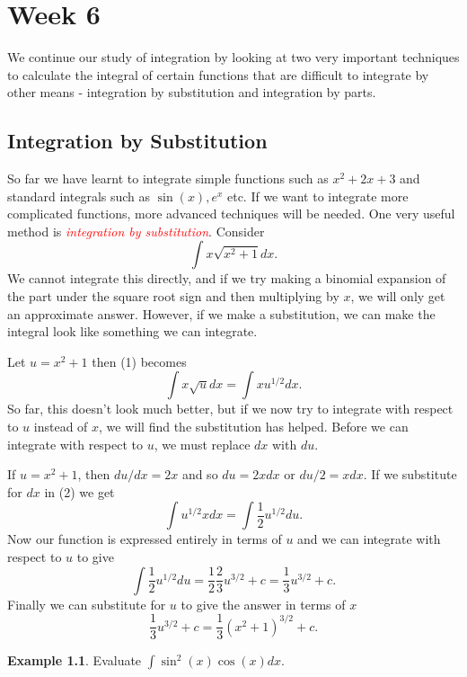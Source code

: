 \documentclass[
  11pt,
  oneside]{book}
\newcommand{\slide}{}
\newcommand{\cpybx}{}
\theoremstyle{definition}
\theoremstyle{definition}
\newtheorem{example}{Example}[chapter]
\theoremstyle{definition}
\theoremstyle{definition}
\theoremstyle{remark}
\begin{document}
\chapter{Week 6}\label{week-six}

We continue our study of integration by looking at two very important techniques to calculate the integral of certain functions that are difficult to integrate by other means - integration by substitution and integration by parts.

\slide

\section{Integration by Substitution}\label{integration-by-substitution}

So far we have learnt to integrate simple functions such as \(x^2 + 2x + 3\) and standard integrals such as \(\sin(x), e^x\) etc. If we want to integrate more complicated functions, more advanced techniques will be needed. One very useful method is \textcolor{red}{\em integration by substitution}. Consider
\[
\int x\sqrt{x^2+1} dx.\tag{1}
\]
We cannot integrate this directly, and if we try making a binomial expansion of the part under the square root sign and then multiplying by \(x\), we will only get an approximate answer. However, if we make a substitution, we can make the integral look like something we can integrate.

Let \(u = x^2+ 1\) then (1) becomes
\[
\int x\sqrt{u} dx=\int xu^{1/2} dx.\tag{2}
\]
So far, this doesn't look much better, but if we now try to integrate with respect to \(u\) instead of \(x\), we will find the substitution has helped. Before we can integrate with respect to \(u\), we must replace \(dx\) with \(du\).

If \(u = x^2+ 1\), then \(du/dx = 2x\) and so \(du = 2x dx\) or \(du/2 = xdx\).
If we substitute for \(dx\) in (2) we get
\[
\int u^{1/2}xdx = \int\frac12u^{1/2}du.
\]
Now our function is expressed entirely in terms of \(u\) and we can integrate with respect to \(u\) to give
\[
\int\frac12u^{1/2}du = \frac 12\frac23u^{3/2}+c = \frac13u^{3/2}+c.
\]
Finally we can substitute for \(u\) to give the answer in terms of \(x\)
\[
\frac 13u^{3/2}+c = \frac13(x^2+1)^{3/2}+c.
\]
\slide

\cpybx

\begin{example}
Evaluate \(\displaystyle\int\sin^2(x)\cos(x)dx\).
\end{example}
\end{document}
